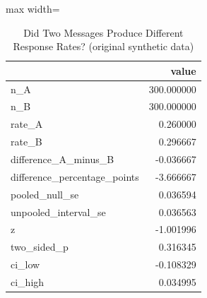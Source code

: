 \begin{table}[htbp]
\centering
\caption{Did Two Messages Produce Different Response Rates? (original synthetic data)}
\begingroup
\small
\setlength{\tabcolsep}{6pt}
\renewcommand{\arraystretch}{1.12}
\begin{adjustbox}{max width=\linewidth}
\begin{tabular}{@{}lr@{}}
\toprule
 & value \\
\midrule
n\_A & 300.000000 \\
n\_B & 300.000000 \\
rate\_A & 0.260000 \\
rate\_B & 0.296667 \\
difference\_A\_minus\_B & -0.036667 \\
difference\_percentage\_points & -3.666667 \\
pooled\_null\_se & 0.036594 \\
unpooled\_interval\_se & 0.036563 \\
z & -1.001996 \\
two\_sided\_p & 0.316345 \\
ci\_low & -0.108329 \\
ci\_high & 0.034995 \\
\bottomrule
\end{tabular}
\end{adjustbox}
\endgroup
\end{table}